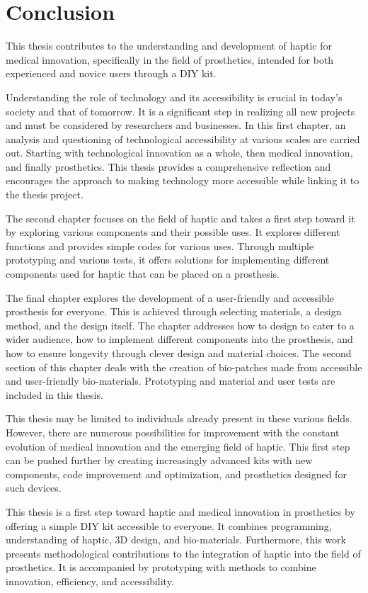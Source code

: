 \chapter{Conclusion}

This thesis contributes to the understanding and development of haptic for medical innovation, specifically in the field of prosthetics, intended for both experienced and novice users through a DIY kit.

Understanding the role of technology and its accessibility is crucial in today's society and that of tomorrow. It is a significant step in realizing all new projects and must be considered by researchers and businesses. In this first chapter, an analysis and questioning of technological accessibility at various scales are carried out. Starting with technological innovation as a whole, then medical innovation, and finally prosthetics. This thesis provides a comprehensive reflection and encourages the approach to making technology more accessible while linking it to the thesis project.

The second chapter focuses on the field of haptic and takes a first step toward it by exploring various components and their possible uses. It explores different functions and provides simple codes for various uses. Through multiple prototyping and various tests, it offers solutions for implementing different components used for haptic that can be placed on a prosthesis.

The final chapter explores the development of a user-friendly and accessible prosthesis for everyone. This is achieved through selecting materials, a design method, and the design itself. The chapter addresses how to design to cater to a wider audience, how to implement different components into the prosthesis, and how to ensure longevity through clever design and material choices. The second section of this chapter deals with the creation of bio-patches made from accessible and user-friendly bio-materials. Prototyping and material and user tests are included in this thesis.

This thesis may be limited to individuals already present in these various fields. However, there are numerous possibilities for improvement with the constant evolution of medical innovation and the emerging field of haptic. This first step can be pushed further by creating increasingly advanced kits with new components, code improvement and optimization, and prosthetics designed for such devices.

This thesis is a first step toward haptic and medical innovation in prosthetics by offering a simple DIY kit accessible to everyone. It combines programming, understanding of haptic, 3D design, and bio-materials. Furthermore, this work presents methodological contributions to the integration of haptic into the field of prosthetics. It is accompanied by prototyping with methods to combine innovation, efficiency, and accessibility.
